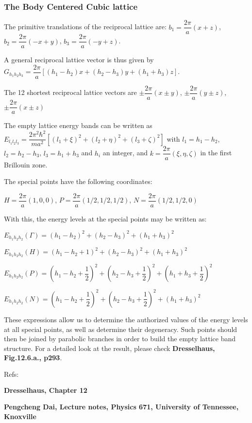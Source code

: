 \documentclass{article}
\begin{document}
    \subsubsection{The Body Centered Cubic lattice}


    The primitive translations of the reciprocal lattice are:
$b_1 = \dfrac{2\pi}{a}(x+z)$, $b_2 = \dfrac{2\pi}{a}(-x+y)$,
$b_3 = \dfrac{2\pi}{a}(-y+z)$.

A general reciprocal lattice vector is thus given by
$G_{h_1 h_2 h_3 } = \dfrac{2\pi}{a}[(h_1-h_2)x + (h_2-h_3)y + (h_1+h_3)z]$.

The 12 shortest reciprocal lattice vectors are
$\pm \dfrac{2\pi}{a}(x \pm y)$, $\pm \dfrac{2\pi}{a}(y \pm z)$,
$\pm \dfrac{2\pi}{a}(x \pm z)$

The empty lattice energy bands can be written as
$E_{l_1 l_2 l_3}= \dfrac{2\pi^2 \hbar^2}{ma^2}[(l_1 + \xi)^2+(l_2 + \eta)^2+(l_3 + \zeta)^2]$
with $l_1=h_1-h_2$, $l_2=h_2-h_3$, $l_3 = h_1+h_3$ and $h_i$ an integer,
and $k=\dfrac{2\pi}{a}(\xi, \eta, \zeta)$ in the first Brillouin zone.

The special points have the following coordinates:

$H= \dfrac{2\pi}{a} (1, 0, 0)$, $P= \dfrac{2\pi}{a} (1/2, 1/2, 1/2)$,
$N= \dfrac{2\pi}{a} (1/2, 1/2, 0)$

With this, the energy levels at the special points may be written as:

$E_{h_1 h_2 h_2}(\Gamma) = (h_1 - h_2)^2 + (h_2-h_3)^2 + (h_1+h_3)^2$

$E_{h_1 h_2 h_2}(H) = (h_1 - h_2 + 1)^2 + (h_2-h_3)^2 + (h_1+h_3)^2$

$E_{h_1 h_2 h_2}(P) = (h_1 - h_2 + \dfrac{1}{2})^2 + (h_2-h_3+\dfrac{1}{2})^2 + (h_1+h_3+\dfrac{1}{2})^2$

$E_{h_1 h_2 h_2}(N) = (h_1 - h_2 + \dfrac{1}{2})^2 + (h_2-h_3+\dfrac{1}{2})^2 + (h_1+h_3)^2$

These expressions allow us to determine the authorized values of the
energy levels at all special points, as well as determine their
degeneracy. Such points should then be joined by parabolic branches in
order to build the empty lattice band structure. For a detailed look at
the result, please check \textbf{Dresselhaus, Fig.12.6.a., p293}.

Refs:

\textbf{Dresselhaus, Chapter 12}

\textbf{Pengcheng Dai, Lecture notes, Physics 671, University of
Tennessee, Knoxville}
\end{document}
